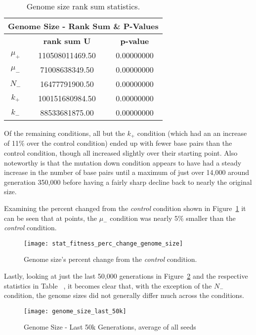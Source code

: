 \begin{table}[H]
	\centering
	\begin{tabular}{|c|c|c|}
		\hline
		\multicolumn{3}{c}{\Large Genome Size - Rank Sum \& P-Values} \\
		\hline
		& \textbf{rank sum U} & \textbf{p-value} \\
		\hline \hline
		$\mu_+$ & 110508011469.50 & 0.00000000 \\ 
		\hline
		$\mu_-$ & 71008638349.50 & 0.00000000 \\ 
		\hline
		$N_-$ & 16477791900.50 & 0.00000000 \\ 
		\hline
		$k_+$ & 100151680984.50 & 0.00000000 \\ 
		\hline
		$k_-$ & 88533681875.00 & 0.00000000 \\ 
		\hline
	\end{tabular}
	\caption[Genome size rank sum statistics]{Genome size rank sum statistics.}
	\label{table:genome_size_stats}
\end{table} 

Of the remaining conditions, all but the $k_+$ condition (which had an an increase of 11\% over the control condition) ended up with fewer base pairs than the control condition, though all increased slightly over their starting point. Also noteworthy is that the mutation down condition appears to have had a steady increase in the number of base pairs until a maximum of just over 14,000 around generation 350,000 before having a fairly sharp decline back to nearly the original size. 

Examining the percent changed from the \textit{control} condition shown in Figure~\ref{fig:genome_size_percent_change} it can be seen that at points, the $\mu_-$ condition was nearly 5\% smaller than the \textit{control} condition. 

\begin{figure}[H]
	\centering
	\texttt{[image: stat\_fitness\_perc\_change\_genome\_size]}
	\caption[Genome size - percent change]{Genome size's percent change from the \textit{control} condition.}
	\label{fig:genome_size_percent_change}
\end{figure}

Lastly, looking at just the last 50,000 generations in Figure~\ref{fig:genome_size_last_50k} and the respective statistics in Table~%
, it becomes clear that, with the exception of the $N_-$ condition, the genome sizes did not generally differ much across the conditions.
\begin{figure}[H]
	\centering
	\texttt{[image: genome\_size\_last\_50k]}
	\caption[Genome size - last 50k generations]{Genome Size - Last 50k Generations, average of all seeds}
	\label{fig:genome_size_last_50k}
\end{figure}

